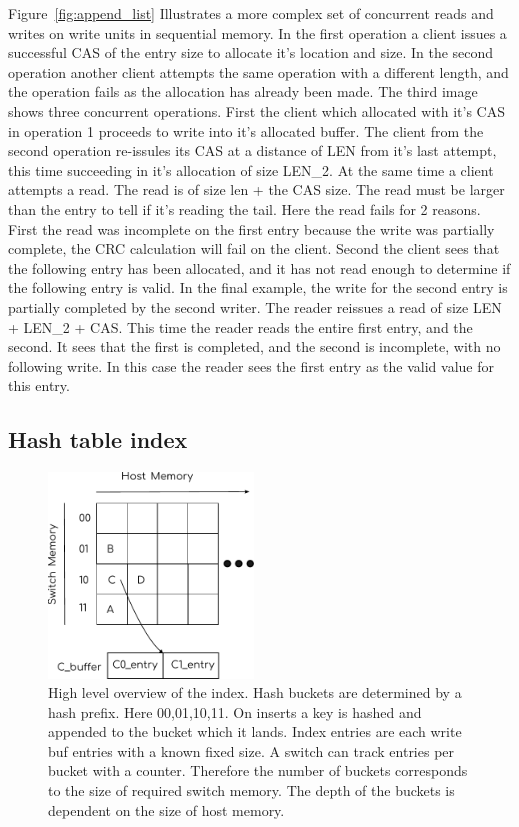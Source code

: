 Figure~\ref{fig:append_list} Illustrates a more complex set of concurrent reads
and writes on write units in sequential memory. In the first operation a client
issues a successful CAS of the entry size to allocate it's location and size. In
the second operation another client attempts the same operation with a different
length, and the operation fails as the allocation has already been made. The
third image shows three concurrent operations. First the client which allocated
with it's CAS in operation 1 proceeds to write into it's allocated buffer. The
client from the second operation re-issules its CAS at a distance of LEN from
it's last attempt, this time succeeding in it's allocation of size LEN\_2. At
the same time a client attempts a read. The read is of size len + the CAS size.
The read must be larger than the entry to tell if it's reading the tail. Here
the read fails for 2 reasons. First the read was incomplete on the first entry
because the write was partially complete, the CRC calculation will fail on the
client. Second the client sees that the following entry has been allocated, and
it has not read enough to determine if the following entry is valid. In the
final example, the write for the second entry is partially completed by the
second writer. The reader reissues a read of size {LEN + LEN\_2 + CAS}. This
time the reader reads the entire first entry, and the second. It sees that the
first is completed, and the second is incomplete, with no following write. In
this case the reader sees the first entry as the valid value for this entry.


\subsection{Hash table index}

\begin{figure}[t] \includegraphics[width=0.485\textwidth]{fig/Index.pdf}

\caption{High level overview of the index. Hash buckets are determined by a hash
prefix. Here 00,01,10,11. On inserts a key is hashed and appended to the bucket
which it lands. Index entries are each write buf entries with a known fixed
size. A switch can track entries per bucket with a counter. Therefore the number
of buckets corresponds to the size of required switch memory. The depth of the
buckets is dependent on the size of host memory.}

\label{fig:index}
\end{figure}

